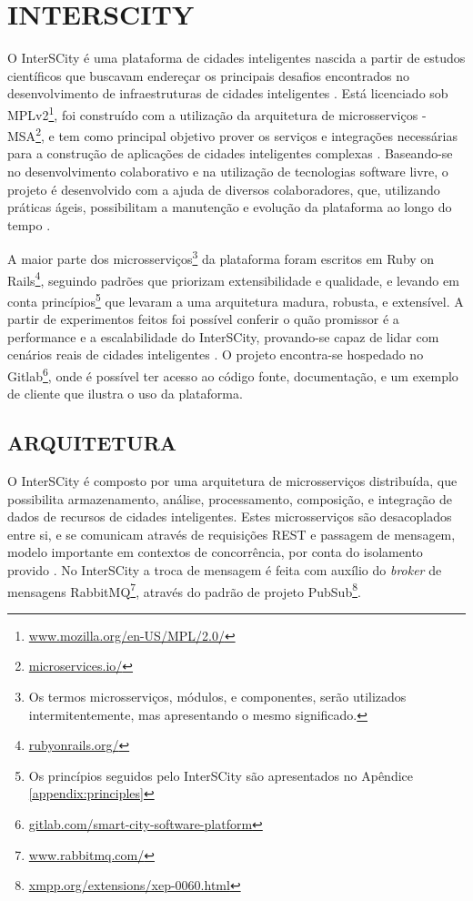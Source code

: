 \chapter[INTERSCITY]{INTERSCITY}
\label{chapter:interscity}

O InterSCity é uma plataforma de cidades inteligentes nascida a partir de
estudos científicos que buscavam endereçar os principais desafios encontrados
no desenvolvimento de infraestruturas de cidades inteligentes \cite{nof2016}.
Está licenciado sob
MPLv2\footnote{\url{www.mozilla.org/en-US/MPL/2.0/}}, foi construído com a
utilização da arquitetura de microsserviços -
MSA\footnote{\url{microservices.io/}}, e tem como principal objetivo prover os
serviços e integrações necessárias para a construção de aplicações de cidades
inteligentes complexas \cite{delesposte2017}. Baseando-se no desenvolvimento
colaborativo e na utilização de tecnologias software livre, o projeto é
desenvolvido com a ajuda de diversos colaboradores, que, utilizando práticas
ágeis, possibilitam a manutenção e evolução da plataforma ao longo do tempo
\cite{delesposte2017}.

A maior parte dos microsserviços\footnote{Os termos microsserviços, módulos, e
componentes, serão utilizados intermitentemente, mas apresentando o mesmo
significado.} da plataforma foram escritos em Ruby on Rails\footnote{\url{rubyonrails.org/}},
seguindo padrões que priorizam extensibilidade e qualidade, e levando em conta
princípios\footnote{Os princípios seguidos pelo InterSCity são apresentados no
Apêndice \ref{appendix:principles}} que levaram a uma arquitetura madura,
robusta, e extensível. A partir de experimentos feitos foi possível conferir
o quão promissor é a performance e a escalabilidade do InterSCity, provando-se
capaz de lidar com cenários reais de cidades inteligentes \cite{delesposte2017}.
O projeto encontra-se hospedado no
Gitlab\footnote{\url{gitlab.com/smart-city-software-platform}},
onde é possível ter acesso ao código fonte, documentação, e um exemplo de
cliente que ilustra o uso da plataforma.

\section{ARQUITETURA}

O InterSCity é composto por uma arquitetura de microsserviços distribuída,
que possibilita armazenamento, análise, processamento, composição, e
integração de dados de recursos de cidades inteligentes. Estes microsserviços
são desacoplados entre si, e se comunicam através de requisições REST e
passagem de mensagem, modelo importante em contextos de concorrência, por conta
do isolamento provido \cite{armstrong2003}. No InterSCity a troca de mensagem
é feita com auxílio do \textit{broker} de mensagens
RabbitMQ\footnote{\url{www.rabbitmq.com/}}, através do padrão de projeto
PubSub\footnote{\url{xmpp.org/extensions/xep-0060.html}}.

